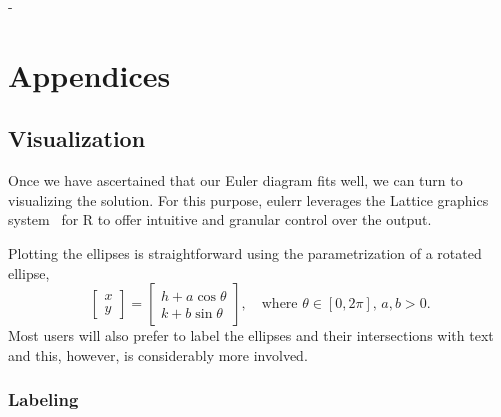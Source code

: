 \documentclass[
  oneside,
  openany,
  numbers=noendperiod,
  parskip=half,
  bibliography=totoc
]{scrbook}\usepackage[]{graphicx}\usepackage{xcolor}
\newlength{\overhang}
\newenvironment{fullwidth}{%
  \blockmargin
  \begin{addmargin*}[0em]{-\overhang}%
}{%
  \end{addmargin*}%
  \unblockmargin
}
\newcommand{\pkg}[1]{{\fontseries{b}\selectfont #1}}
\begin{document}
\begin{fullwidth}
\part*{Appendices}
\end{fullwidth}
\appendix
\chapter{Visualization}
\label{ap:visualization}

Once we have ascertained that our Euler diagram fits well, we can turn to
visualizing the solution. For this purpose, \pkg{eulerr} leverages the
\pkg{Lattice} graphics system~\citep{Sarkar_2008} for R to offer intuitive and
granular control over the output.

Plotting the ellipses is straightforward using the parametrization of a rotated
ellipse,
%
\begin{equation*}
\begin{bmatrix}
  x \\ y
\end{bmatrix} =
\begin{bmatrix}
  h + a \cos{\theta} \\
  k + b \sin{\theta}
\end{bmatrix},\quad \text{where } \theta \in [0, 2\pi],\, a,b>0.
\end{equation*}
%
Most users will also prefer to label the ellipses and their intersections
with text and this, however, is considerably more involved.

\section{Labeling}
\label{sec:labeling}
\end{document}
